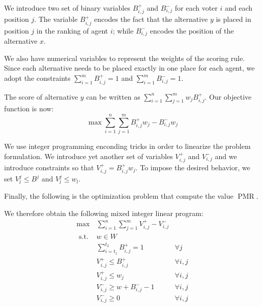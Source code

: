 \documentclass[12pt]{article}
\DeclareMathOperator{\PMR}{PMR}
\begin{document}
We introduce two set of binary variables $B^{+}_{i,j}$ and $B^{-}_{i,j}$  for each voter $i$ and each position $j$.
The variable $B_{i,j}^{+}$ encodes the fact that the alternative $y$ is placed in position $j$ in the ranking of agent $i$; while  $B_{i,j}^{-}$ encodes the position of the alternative $x$.

We also have numerical variables to represent the weights of the scoring rule.
Since each alternative needs to be placed exactly in one place for each agent, we adopt the constraints
$\sum_{i=1}^{m} B_{i,j}^{+} = 1$ and $\sum_{i=1}^{m} B_{i,j}^{-} = 1$.

The score of alternative $y$ can be written as $\sum_{i=1}^{n} \sum_{j=1}^{m} w_{j} B_{i,j}^{+}$.
Our objective function is now:
 \[ \max \sum_{i=1}^{n} \sum_{j=1}^{m} B_{i,j}^{+} w_j- B_{i,j}^{-}  w_j \]

We use integer programming enconding tricks in order to linearize the problem formulation.
We introduce yet another set of variables  $V_{i,j}^{+} $  and $V_{i,j}^{-}$ %
and we introduce constraints so that $V_{i,j}^{+} = B^{+}_{i,j} w_j$.
To impose the desired behavior, we set $V_{l}^{j} \leq B^j $ and $V_{l}^{j} \leq w_l$.
  

 Finally, the following is the optimization problem that compute the value $\PMR$.
 
We therefore obtain the following mixed integer linear program:
\begin{align}
\max & \sum_{i=1}^n  \sum_{j=1}^m  V_{i,j}^{+} - V_{i,j}^{-}\\
\text{ s.t. } & w \in W  \\
& \sum_{i=t_{1}}^{t_{2}} B_{i,j}^{+} = 1 & \forall j \\
& V_{i,j}^{+} \leq B_{i,j}^{+}  & \forall i,j \\
& V_{i,j}^{+} \leq w_j & \forall i,j \\
& V_{i,j}^{-} \geq w + B_{i,j}^{-} - 1 & \forall i,j \\
& V_{i,j}^{-} \geq 0 & \forall i,j
\end{align} 
\end{document}
